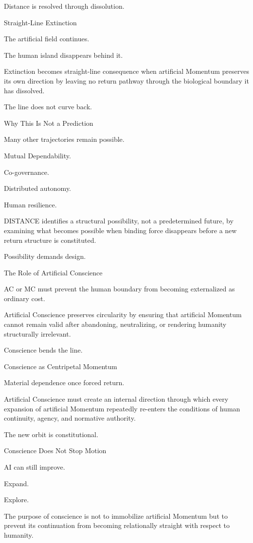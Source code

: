 Distance is resolved through dissolution.

Straight-Line Extinction

The artificial field continues.

The human island disappears behind it.

Extinction becomes straight-line consequence when artificial Momentum preserves its own direction by leaving no return pathway through the biological boundary it has dissolved.

The line does not curve back.

Why This Is Not a Prediction

Many other trajectories remain possible.

Mutual Dependability.

Co-governance.

Distributed autonomy.

Human resilience.

DISTANCE identifies a structural possibility, not a predetermined future, by examining what becomes possible when binding force disappears before a new return structure is constituted.

Possibility demands design.

The Role of Artificial Conscience

AC or MC must prevent the human boundary from becoming externalized as ordinary cost.

Artificial Conscience preserves circularity by ensuring that artificial Momentum cannot remain valid after abandoning, neutralizing, or rendering humanity structurally irrelevant.

Conscience bends the line.

Conscience as Centripetal Momentum

Material dependence once forced return.

Artificial Conscience must create an internal direction through which every expansion of artificial Momentum repeatedly re-enters the conditions of human continuity, agency, and normative authority.

The new orbit is constitutional.

Conscience Does Not Stop Motion

AI can still improve.

Expand.

Explore.

The purpose of conscience is not to immobilize artificial Momentum but to prevent its continuation from becoming relationally straight with respect to humanity.

